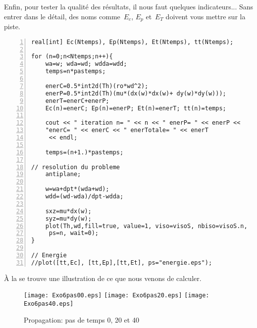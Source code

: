 \medskip
Enfin, pour tester la qualité des résultats, il nous faut quelques indicateurs... Sans entrer dans le détail, des noms comme~$E_c$, $E_p$ et~$E_T$ doivent vous mettre sur la piste.

\color{gris}\scriptsize
\begin{Verbatim}[numbers=left,numbersep=3pt,firstnumber=last]
real[int] Ec(Ntemps), Ep(Ntemps), Et(Ntemps), tt(Ntemps); 

for (n=0;n<Ntemps;n++){	
	wa=w; wda=wd; wdda=wdd; 	
	temps=n*pastemps; 

	enerC=0.5*int2d(Th)(ro*wd^2);
	enerP=0.5*int2d(Th)(mu*(dx(w)*dx(w)+ dy(w)*dy(w)));
	enerT=enerC+enerP;
	Ec(n)=enerC; Ep(n)=enerP; Et(n)=enerT; tt(n)=temps; 
		
	cout << " iteration n= " << n << " enerP= " << enerP << 
    "enerC= " << enerC << " enerTotale= " << enerT 
     << endl;
	
	temps=(n+1.)*pastemps; 

// resolution du probleme 
	antiplane;
	
	w=wa+dpt*(wda+wd);
	wdd=(wd-wda)/dpt-wdda; 

	sxz=mu*dx(w);
	syz=mu*dy(w); 
	plot(Th,wd,fill=true, value=1, viso=visoS, nbiso=visoS.n, 
     ps=n, wait=0); 	
}

// Energie 
//plot([tt,Ec], [tt,Ep],[tt,Et], ps="energie.eps"); 
\end{Verbatim}
\color{black}\normalsize

\medskip
À la  se trouve une illustration de ce que nous venons de calculer.

\begin{figure}[ht]
  \center
  \texttt{[image: Exo6pas00.eps]} \hfill
  \texttt{[image: Exo6pas20.eps]} \hfill
  \texttt{[image: Exo6pas40.eps]}
  \caption{\label{Fig-Exo6} Propagation: pas de temps 0, 20 et 40}
\end{figure}

